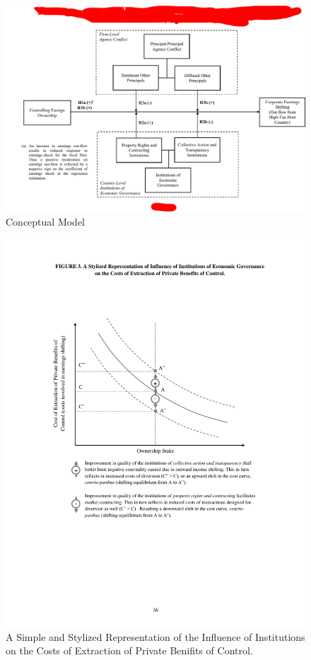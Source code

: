 
\begin{figure}
\caption{Conceptual Model}
\vspace{1em}
	\label{fig:model}
	\centering
	\includegraphics[width=1.00\textwidth]{chapter01/ConceptualModel.pdf}	
\end{figure}

\begin{figure}[h]
	\centering
	\caption{A Simple and Stylized Representation of the Influence of Institutions on the Costs of Extraction of Private Benifits of Control.}
	\vspace{1em}
	\label{fig:costcurve}
	\includegraphics[width=1.00\textwidth]{chapter01/CostCurve.pdf}	
\end{figure}


